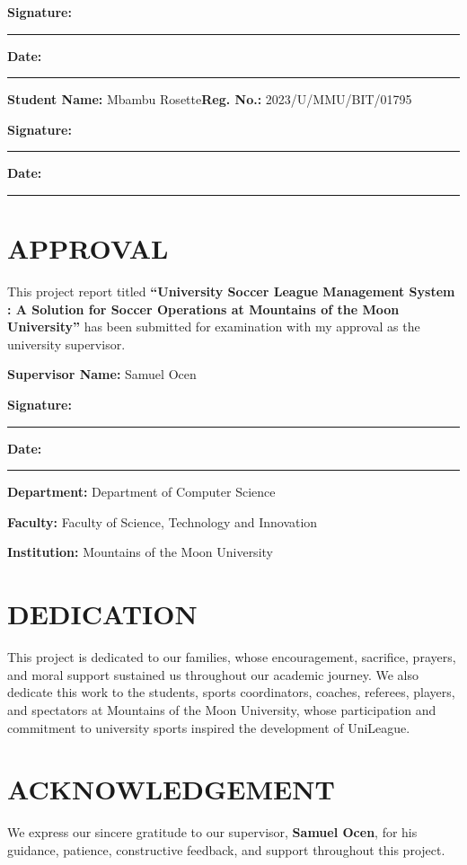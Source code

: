 \documentclass[12pt,a4paper]{report}
\begin{document}
\textbf{Signature:} \rule{7cm}{0.4pt}\hfill\textbf{Date:} \rule{4cm}{0.4pt}
\vspace{1.2cm}

\textbf{Student Name:} Mbambu Rosette\hfill\textbf{Reg. No.:} 2023/U/MMU/BIT/01795

\textbf{Signature:} \rule{7cm}{0.4pt}\hfill\textbf{Date:} \rule{4cm}{0.4pt}

\newpage\chapter*{APPROVAL}
This project report titled \textbf{``University Soccer League Management System :
A Solution for Soccer Operations at Mountains of the Moon University''}
has been submitted for examination with my approval as the university supervisor.
\vspace{1.5cm}

\textbf{Supervisor Name:} Samuel Ocen

\textbf{Signature:} \rule{7cm}{0.4pt}\hfill\textbf{Date:} \rule{4cm}{0.4pt}
\vspace{1.4cm}

\textbf{Department:} Department of Computer Science

\textbf{Faculty:} Faculty of Science, Technology and Innovation

\textbf{Institution:} Mountains of the Moon University

\newpage\chapter*{DEDICATION}
This project is dedicated to our families, whose encouragement, sacrifice, prayers, and moral support
sustained us throughout our academic journey. We also dedicate this work to the students, sports
coordinators, coaches, referees, players, and spectators at Mountains of the Moon University, whose
participation and commitment to university sports inspired the development of UniLeague.

\newpage\chapter*{ACKNOWLEDGEMENT}
We express our sincere gratitude to our supervisor, \textbf{Samuel Ocen}, for his guidance, patience,
constructive feedback, and support throughout this project.
\end{document}
